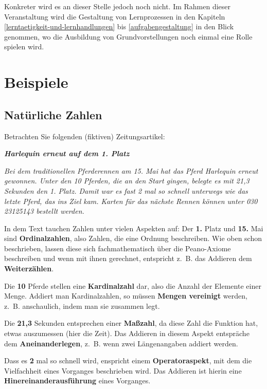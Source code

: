 \documentclass[
]{scrbook}
\renewenvironment{quote}{
  \list{}{
	\leftmargin0.2cm   %
    \rightmargin\leftmargin
      	\def\FrameCommand
    {%
        {\color{quoteColor}\vrule width 2pt}%
        \hspace{0pt}%
    }%
    \MakeFramed{\advance \hsize -\width \FrameRestore}    \color{quoteColor}
    }
  \item\relax
}
{\endlist\color{black}\endMakeFramed}
\theoremstyle{definition}
\theoremstyle{definition}
\theoremstyle{definition}
\theoremstyle{definition}
\theoremstyle{remark}
\begin{document}
Konkreter wird es an dieser Stelle jedoch noch nicht. Im Rahmen dieser Veranstaltung wird die Gestaltung von Lernprozessen in den Kapiteln \ref{lerntaetigkeit-und-lernhandlungen} bis \ref{aufgabengestaltung} in den Blick genommen, wo die Ausbildung von Grundvorstellungen noch einmal eine Rolle spielen wird.

\hypertarget{beispiele}{%
\section{Beispiele}\label{beispiele}}

\hypertarget{natuxfcrliche-zahlen}{%
\subsection{Natürliche Zahlen}\label{natuxfcrliche-zahlen}}

Betrachten Sie folgenden (fiktiven) Zeitungsartikel:

\begin{quote}
\textbf{\emph{Harlequin erneut auf dem 1. Platz}}

\emph{Bei dem traditionellen Pferderennen am 15. Mai hat das Pferd Harlequin erneut gewonnen. Unter den 10 Pferden, die an den Start gingen, belegte es mit 21,3 Sekunden den 1. Platz. Damit war es fast 2 mal so schnell unterwegs wie das letzte Pferd, das ins Ziel kam. Karten für das nächste Rennen können unter 030 23125143 bestellt werden.}
\end{quote}

In dem Text tauchen Zahlen unter vielen Aspekten auf: Der \textbf{1.} Platz und \textbf{15.} Mai sind \textbf{Ordinalzahlen}, also Zahlen, die eine Ordnung beschreiben. Wie oben schon beschrieben, lassen diese sich fachmathematisch über die Peano-Axiome beschreiben und wenn mit ihnen gerechnet, entspricht z.~B. das Addieren dem \textbf{Weiterzählen}.

Die \textbf{10} Pferde stellen eine \textbf{Kardinalzahl} dar, also die Anzahl der Elemente einer Menge. Addiert man Kardinalzahlen, so müssen \textbf{Mengen vereinigt} werden, z.~B. anschaulich, indem man sie zusammen legt.

Die \textbf{21,3} Sekunden entsprechen einer \textbf{Maßzahl}, da diese Zahl die Funktion hat, etwas auszumessen (hier die Zeit). Das Addieren in diesem Aspekt entspräche dem \textbf{Aneinanderlegen}, z.~B. wenn zwei Längenangaben addiert werden.

Dass es \textbf{2} mal so schnell wird, enspricht einem \textbf{Operatoraspekt}, mit dem die Vielfachheit eines Vorganges beschrieben wird. Das Addieren ist hierin eine \textbf{Hinereinanderausführung} eines Vorganges.
\end{document}
